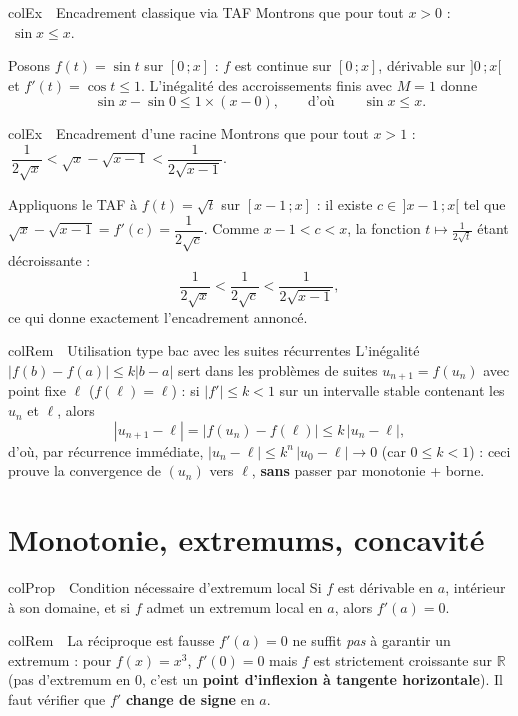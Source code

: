 \documentclass[11pt,a4paper]{article}
\newenvironment{propriete}[1][Propriété]
  {\begin{fiche}{colProp}{\ding{72}~~#1}}{\end{fiche}}
\newenvironment{exemple}[1][Exemple]
  {\begin{fiche}{colEx}{\ding{217}~~#1}}{\end{fiche}}
\newenvironment{remarque}[1][Remarque]
  {\begin{fiche}{colRem}{\ding{43}~~#1}}{\end{fiche}}
\begin{document}
\begin{exemple}[Encadrement classique via TAF]
Montrons que pour tout $x > 0$ : $\ \sin x \leq x$.

\smallskip
Posons $f(t) = \sin t$ sur $[0\,;x]$ : $f$ est continue sur $[0\,;x]$, dérivable sur $]0\,;x[$ et $f'(t) = \cos t \leq 1$. L'inégalité des accroissements finis avec $M = 1$ donne
\[
  \sin x - \sin 0 \leq 1 \times (x - 0), \qquad\text{d'où}\qquad \sin x \leq x.
\]
\end{exemple}

\begin{exemple}[Encadrement d'une racine]
Montrons que pour tout $x > 1$ : $\ \dfrac{1}{2\sqrt{x}} < \sqrt{x} - \sqrt{x - 1} < \dfrac{1}{2\sqrt{x-1}}$.

\smallskip
Appliquons le TAF à $f(t) = \sqrt{t}$ sur $[x-1\,;x]$ : il existe $c \in\, ]x-1\,;x[$ tel que $\sqrt{x} - \sqrt{x-1} = f'(c) = \dfrac{1}{2\sqrt{c}}$. Comme $x - 1 < c < x$, la fonction $t \mapsto \frac{1}{2\sqrt{t}}$ étant décroissante :
\[
  \frac{1}{2\sqrt{x}} < \frac{1}{2\sqrt{c}} < \frac{1}{2\sqrt{x-1}},
\]
ce qui donne exactement l'encadrement annoncé.
\end{exemple}

\begin{remarque}[Utilisation type bac avec les suites récurrentes]
L'inégalité $|f(b) - f(a)| \leq k|b - a|$ sert dans les problèmes de suites $u_{n+1} = f(u_n)$ avec point fixe $\ell$ ($f(\ell) = \ell$) : si $|f'| \leq k < 1$ sur un intervalle stable contenant les $u_n$ et $\ell$, alors
\[
  |u_{n+1} - \ell| = |f(u_n) - f(\ell)| \leq k\,|u_n - \ell|,
\]
d'où, par récurrence immédiate, $|u_n - \ell| \leq k^n\,|u_0 - \ell| \to 0$ (car $0 \leq k < 1$) : ceci prouve la convergence de $(u_n)$ vers $\ell$, \textbf{sans} passer par monotonie + borne.
\end{remarque}

\section{Monotonie, extremums, concavité}

\begin{propriete}[Condition nécessaire d'extremum local]
Si $f$ est dérivable en $a$, intérieur à son domaine, et si $f$ admet un extremum local en $a$, alors $f'(a) = 0$.
\end{propriete}

\begin{remarque}[La réciproque est fausse]
$f'(a) = 0$ ne suffit \emph{pas} à garantir un extremum : pour $f(x) = x^3$, $f'(0) = 0$ mais $f$ est strictement croissante sur $\mathbb{R}$ (pas d'extremum en $0$, c'est un \textbf{point d'inflexion à tangente horizontale}). Il faut vérifier que $f'$ \textbf{change de signe} en $a$.
\end{remarque}
\end{document}
